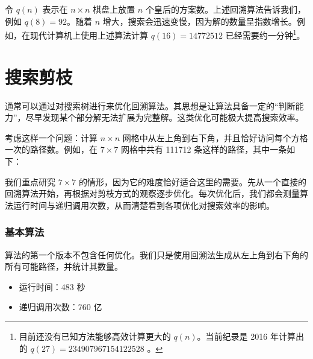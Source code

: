 令 $q(n)$ 表示在 $n \times n$ 棋盘上放置 $n$ 个皇后的方案数。上述回溯算法告诉我们，例如 $q(8)=92$。随着 $n$ 增大，搜索会迅速变慢，因为解的数量呈指数增长。例如，在现代计算机上使用上述算法计算 $q(16)=14772512$ 已经需要约一分钟\footnote{目前还没有已知方法能够高效计算更大的 $q(n)$。当前纪录是 2016 年计算出的 $q(27)=234907967154122528$ \cite{q27}。}。

\section{搜索剪枝}

通常可以通过对搜索树进行来优化回溯算法。其思想是让算法具备一定的“判断能力”，尽早发现某个部分解无法扩展为完整解。这类优化可能极大提高搜索效率。

考虑这样一个问题：计算 $n \times n$ 网格中从左上角到右下角，并且恰好访问每个方格一次的路径数。例如，在 $7 \times 7$ 网格中共有 111712 条这样的路径，其中一条如下：

\begin{center}
\end{center}

我们重点研究 $7 \times 7$ 的情形，因为它的难度恰好适合这里的需要。先从一个直接的回溯算法开始，再根据对剪枝方式的观察逐步优化。每次优化后，我们都会测量算法运行时间与递归调用次数，从而清楚看到各项优化对搜索效率的影响。

\subsubsection{基本算法}

算法的第一个版本不包含任何优化。我们只是使用回溯法生成从左上角到右下角的所有可能路径，并统计其数量。

\begin{itemize}
\item
运行时间：483 秒
\item
递归调用次数：760 亿
\end{itemize}

